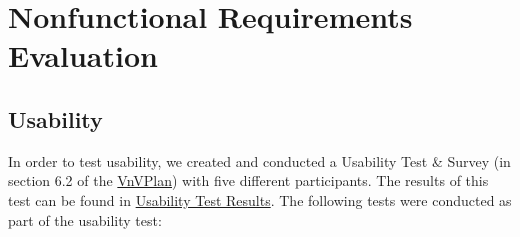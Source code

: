 \documentclass[12pt, titlepage]{article}
\begin{document}
\section{Nonfunctional Requirements Evaluation}

\subsection{Usability}

In order to test usability, we created and conducted a Usability Test \& Survey (in section 6.2 of the 
\href{https://github.com/davimang/REACH/blob/main/docs/VnVPlan/VnVPlan.pdf}{VnVPlan}) with five different participants.
The results of this test can be found in \href{https://github.com/davimang/REACH/blob/main/docs/VnVReport/UsabilityTestResults/UsabilityTestResults.pdf}{Usability Test Results}.
The following tests were conducted as part of the usability test:
\end{document}
